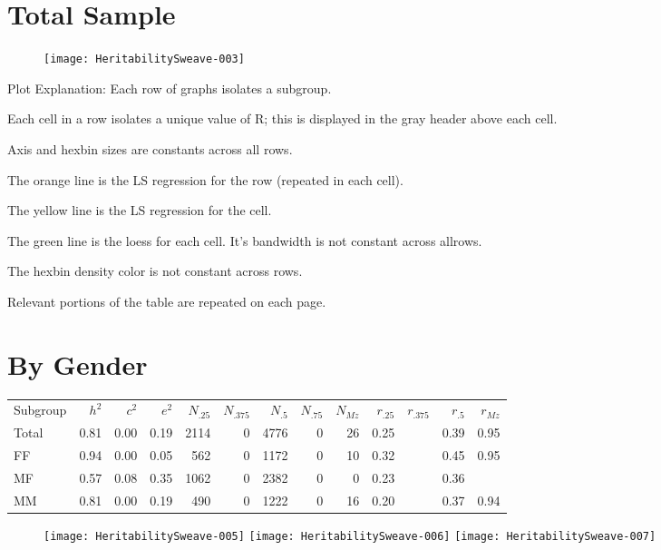 \documentclass[a4paper]{article}
\begin{document}
\section{Total Sample}
\begin{figure}[htbp]
\texttt{[image: HeritabilitySweave-003]}
\end{figure}
Plot Explanation: Each row of graphs isolates a subgroup.  

Each cell in a row isolates a unique value of R; this is displayed in the gray header above each cell. 

Axis and hexbin sizes are constants across all rows.

The orange line is the LS regression for the row (repeated in each cell).

The yellow line is the LS regression for the cell.

The green line is the loess for each cell.  It's bandwidth is not constant across allrows.

The hexbin density color is not constant across rows.

Relevant portions of the table are repeated on each page.
\newpage
\section{By Gender}
\begin{table}[ht]
\begin{center}
\begin{tabular}{l|rrr|rrrrr|rrrr}
 Subgroup & $h^2$ & $c^2$ & $e^2$ & $N_{.25}$ & $N_{.375}$ & $N_{.5}$ & $N_{.75}$ & $N_{Mz}$ & $r_{.25}$ & $r_{.375}$ & $r_{.5}$ & $r_{Mz}$ \\ 
 Total & 0.81 & 0.00 & 0.19 & 2114 &   0 & 4776 &   0 &  26 & 0.25 &  & 0.39 & 0.95 \\ 
   \hline
FF & 0.94 & 0.00 & 0.05 & 562 &   0 & 1172 &   0 &  10 & 0.32 &  & 0.45 & 0.95 \\ 
  MF & 0.57 & 0.08 & 0.35 & 1062 &   0 & 2382 &   0 &   0 & 0.23 &  & 0.36 &  \\ 
  MM & 0.81 & 0.00 & 0.19 & 490 &   0 & 1222 &   0 &  16 & 0.20 &  & 0.37 & 0.94 \\ 
  \end{tabular}
\end{center}
\end{table}\begin{figure}[htbp]
\texttt{[image: HeritabilitySweave-005]}
\texttt{[image: HeritabilitySweave-006]}
\texttt{[image: HeritabilitySweave-007]}
\end{figure}
\end{document}
